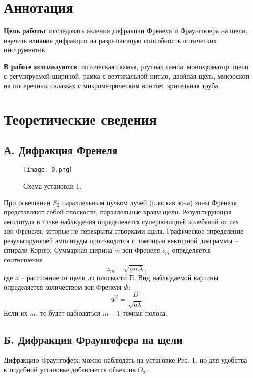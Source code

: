 






\section{Аннотация}
\textbf{Цель работы}: исследовать явления дифракции Френеля и Фраунгофера на щели, изучить влияние дифракции на разрешающую способность оптических инструментов.


\textbf{В работе используются}: оптическая скамья, ртутная лампа, монохроматор, щели с регулируемой шириной, рамка с вертикальной нитью, двойная щель, микроскоп на поперечных салазках с микрометрическим винтом, зрительная труба.

\section{Теоретические сведения}
\subsection*{А. Дифракция Френеля}
\begin{figure}[H]
	\texttt{[image: 0.png]}
	\centering
	\caption{Схема установки 1.}
\end{figure}
При освещении $S_2$ параллельным пучком лучей (плоская зона) зоны Френеля представляют собой плоскости, параллельные краям щели. Результирующая амплитуда в точке наблюдения определеяется суперпозицией колебаний от тех зон Френеля, которые не перекрыты створками щели. Графическое определение результирующей амплитуды производится с помощью векторной диаграммы -- спирали Корню. Суммарная ширина $m$ зон Френеля $z_m$ определяется соотношение
\begin{equation}
z_m = \sqrt{am\lambda},
\end{equation}
где $a$ -- расстояние от щели до плоскости П. Вид наблюдаемой картины определяется количеством зон Френеля $\Phi$:
$$
\Phi^2 = \dfrac{D}{\sqrt{a\lambda}}
$$
Если их $m$, то будет набюдаться $m-1$ тёмная полоса.
\subsection*{Б. Дифракция Фраунгофера на щели}

Дифракцию Фраунгофера можно наблюдать на установке Рис. 1, но для удобства к подобной установке добавляется объектив $O_2$.

